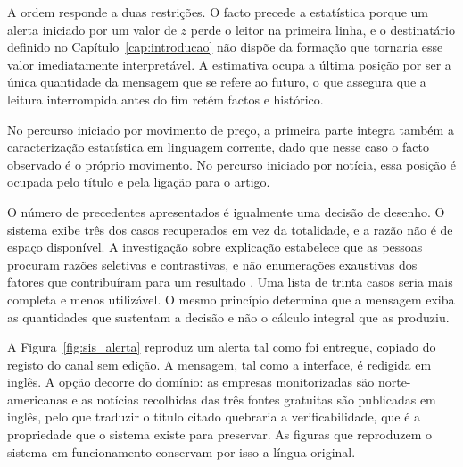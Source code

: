 A ordem responde a duas restrições. O facto precede a estatística porque um alerta iniciado por um
valor de $z$ perde o leitor na primeira linha, e o destinatário definido no
Capítulo~\ref{cap:introducao} não dispõe da formação que tornaria esse valor imediatamente
interpretável. A estimativa ocupa a última posição por ser a única quantidade da mensagem que se
refere ao futuro, o que assegura que a leitura interrompida antes do fim retém factos e histórico.

No percurso iniciado por movimento de preço, a primeira parte integra também a caracterização
estatística em linguagem corrente, dado que nesse caso o facto observado é o próprio movimento. No
percurso iniciado por notícia, essa posição é ocupada pelo título e pela ligação para o artigo.

O número de precedentes apresentados é igualmente uma decisão de desenho. O sistema exibe três dos
casos recuperados em vez da totalidade, e a razão não é de espaço disponível. A investigação sobre
explicação estabelece que as pessoas procuram razões seletivas e contrastivas, e não enumerações
exaustivas dos fatores que contribuíram para um resultado \autocite{miller2019explanation}. Uma
lista de trinta casos seria mais completa e menos utilizável. O mesmo princípio determina que a
mensagem exiba as quantidades que sustentam a decisão e não o cálculo integral que as produziu.

A Figura~\ref{fig:sis_alerta} reproduz um alerta tal como foi entregue, copiado do registo do
canal sem edição. A mensagem, tal como a interface, é redigida em inglês. A opção decorre do
domínio: as empresas monitorizadas são norte-americanas e as notícias recolhidas das três fontes
gratuitas são publicadas em inglês, pelo que traduzir o título citado quebraria a verificabilidade,
que é a propriedade que o sistema existe para preservar. As figuras que reproduzem o sistema em
funcionamento conservam por isso a língua original.

